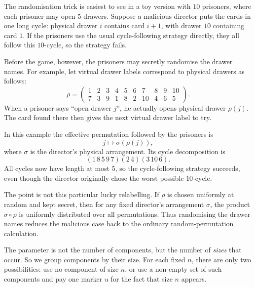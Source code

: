 The randomisation trick is easiest to see in a toy version with $10$ prisoners, where each
prisoner may open $5$ drawers. Suppose a malicious director puts the cards in one long cycle:
physical drawer $i$ contains card $i+1$, with drawer $10$ containing card $1$. If the prisoners
use the usual cycle-following strategy directly, they all follow this $10$-cycle, so the strategy
fails.

Before the game, however, the prisoners may secretly randomise the drawer names. For example,
let virtual drawer labels correspond to physical drawers as follows:
\begin{equation*}
    \rho =
    \begin{pmatrix}
        1&2&3&4&5&6&7&8&9&10\\
        7&3&9&1&8&2&10&4&6&5
    \end{pmatrix}.
\end{equation*}
When a prisoner says ``open drawer $j$'', he actually opens physical drawer $\rho(j)$.
The card found there then gives the next virtual drawer label to try.

In this example the effective permutation followed by the prisoners is
\begin{equation*}
    j \longmapsto \sigma(\rho(j)),
\end{equation*}
where $\sigma$ is the director's physical arrangement. Its cycle decomposition is
\begin{equation*}
    (1\,8\,5\,9\,7)(2\,4)(3\,10\,6).
\end{equation*}
All cycles now have length at most $5$, so the cycle-following strategy succeeds, even though
the director originally chose the worst possible $10$-cycle.

The point is not this particular lucky relabelling. If $\rho$ is chosen uniformly at random and
kept secret, then for any fixed director's arrangement $\sigma$, the product $\sigma\circ\rho$
is uniformly distributed over all permutations. Thus randomising the drawer names reduces the
malicious case back to the ordinary random-permutation calculation.


The parameter is not the number of components, but the number of \textit{sizes} that occur.
So we group components by their size. For each fixed $n$, there are only two possibilities:
use no component of size $n$, or use a non-empty set of such components and pay one marker
$u$ for the fact that size $n$ appears.

